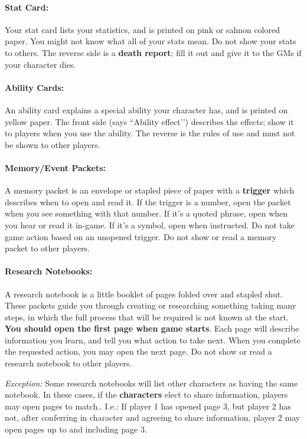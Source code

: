 \documentclass[sheet]{GL2020}
\begin{document}
\paragraph{Stat Card:} Your stat card lists your statistics, and is printed on pink or salmon colored paper. You might not know what all of your stats mean. Do not show your stats to others. The reverse side is a {\bf death report}; fill it out and give it to the GMs if your character dies.

\paragraph{Ability Cards:} An ability card explains a special ability your character has, and is printed on yellow paper. The front side (says ``Ability effect'’) describes the effects; show it to players when you use the ability.  The reverse is the rules of use and must not be shown to other players.

\paragraph{Memory/Event Packets:} A memory packet is an envelope or stapled piece of paper with a {\bf trigger} which describes when to open and read it. If the trigger is a number, open the packet when you see something with that number. If it's a quoted phrase, open when you hear or read it in-game.  If it's a symbol, open when instructed. Do not take game action based on an unopened trigger. Do not show or read a memory packet to other players.

\paragraph{Research Notebooks:} A research notebook is a little booklet of pages folded over and stapled shut. These packets guide you through creating or researching something taking many steps, in which the full process that will be required is not known at the start. \textbf{You should open the first page when game starts}. Each page will describe information you learn, and tell you what action to take next. When you complete the requested action, you may open the next page. Do not show or read a research notebook to other players. 

\emph{Exception:} Some research notebooks will list other characters as having the same notebook. In these cases, if the \textbf{characters} elect to share information, players may open pages to match.. I.e.: If player 1 has opened page 3, but player 2 has not, after conferring in character and agreeing to share information, player 2 may open pages up to and including page 3.
\end{document}
